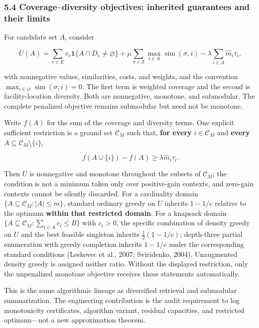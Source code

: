 \documentclass[
  11pt]{article}
\begin{document}
\subsubsection{5.4 Coverage--diversity objectives: inherited guarantees
and their
limits}\label{coveragediversity-objectives-inherited-guarantees-and-their-limits}

For candidate set \(A\), consider

\[U(A)=\sum_{e\in E}v_e\mathbf 1\{A\cap D_e\ne\varnothing\}+\mu\sum_{\sigma\in\mathcal S}\max_{i\in A}\operatorname{sim}(\sigma,i)-\lambda\sum_{i\in A}\hat m_i\tau_i,\]

with nonnegative values, similarities, costs, and weights, and the
convention \(\max_{i\in\varnothing}\operatorname{sim}(\sigma,i)=0\). The
first term is weighted coverage and the second is facility-location
diversity. Both are nonnegative, monotone, and submodular. The complete
penalized objective remains submodular but need not be monotone.

Write \(f(A)\) for the sum of the coverage and diversity terms. One
explicit sufficient restriction is a ground set \(\mathcal C_M\) such
that, \textbf{for every} \(i\in\mathcal C_M\) and \textbf{every}
\(A\subseteq\mathcal C_M\setminus\{i\}\),

\[f(A\cup\{i\})-f(A)\ge\lambda\hat m_i\tau_i.\]

Then \(U\) is nonnegative and monotone throughout the subsets of
\(\mathcal C_M\); the condition is not a minimum taken only over
positive-gain contexts, and zero-gain contexts cannot be silently
discarded. For a cardinality domain
\(\{A\subseteq\mathcal C_M:|A|\le m\}\), standard ordinary greedy on
\(U\) inherits \(1-1/e\) relative to the optimum \textbf{within that
restricted domain}. For a knapsack domain
\(\{A\subseteq\mathcal C_M:\sum_{i\in A}c_i\le B\}\) with \(c_i>0\), the
specific combination of density greedy on \(U\) and the best feasible
singleton inherits \(\tfrac12(1-1/e)\); depth-three partial enumeration
with greedy completion inherits \(1-1/e\) under the corresponding
standard conditions (Leskovec et al., 2007; Sviridenko, 2004).
Unaugmented density greedy is assigned neither ratio. Without the
displayed restriction, only the unpenalized monotone objective receives
these statements automatically.

This is the same algorithmic lineage as diversified retrieval and
submodular summarization. The engineering contribution is the audit
requirement to log monotonicity certificates, algorithm variant,
residual capacities, and restricted optimum---not a new approximation
theorem.
\end{document}
